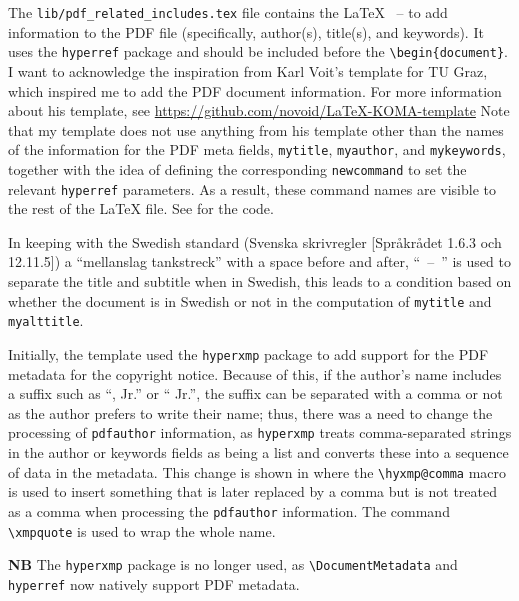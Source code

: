 \documentclass[12pt, twoside]{article}
\newcommand{\fname}[1]{\texttt{#1}}
\begin{document}
The \fname{lib/pdf\_related\_includes.tex} file contains the \LaTeX{} ~-- to add information
to the \gls{PDF} file (specifically, author(s), title(s), and keywords). It uses the
\texttt{hyperref} package and should be included before the \texttt{\textbackslash begin\{document\}}.
I want to acknowledge the inspiration from Karl Voit's template for TU Graz, which inspired me to add the \gls{PDF} document information. For more information about his template, see \url{https://github.com/novoid/LaTeX-KOMA-template}
Note that my template does not use anything from his template other than the names of the information for the \gls{PDF} meta fields, \ie \texttt{mytitle}, \texttt{myauthor}, and \texttt{mykeywords}, together with the idea of defining the corresponding \texttt{newcommand} to set the relevant \texttt{hyperref} parameters. As a result, these command names are visible to the rest of the \LaTeX{} file. See  for the code.

In keeping with the Swedish standard (\foreignlanguage{swedish}{Svenska skrivregler [Språkrådet 1.6.3 och 12.11.5]}) a \enquote{\foreignlanguage{swedish}{mellanslag tankstreck}} with a space before and after, \ie \enquote{\hbox{ – }} is used to separate the title and subtitle when in Swedish, this leads to a condition based on whether the document is in Swedish or not in the computation of \texttt{mytitle} and \texttt{myalttitle}.

Initially, the template used the \texttt{hyperxmp} package to add support for the \gls{PDF} metadata for the copyright notice. Because of this, if the author's name includes a suffix such as \enquote{, Jr.} or \enquote{ Jr.}, \ie the suffix can be separated with a comma or not as the author prefers to write their name; thus, there was a need to change the processing of \texttt{pdfauthor} information, as \texttt{hyperxmp} treats comma-separated strings in the author or keywords fields as being a list and converts these into a sequence of data in the metadata. This change is shown in  where the \texttt{\textbackslash hyxmp@comma} macro is used to insert something that is later replaced by a comma but is not treated as a comma when processing the \texttt{pdfauthor} information. The command \texttt{\textbackslash xmpquote} is used to wrap the whole name.

\noindent \textbf{NB} The \texttt{hyperxmp} package is no longer used, as \texttt{\textbackslash DocumentMetadata} and \texttt{hyperref} now natively support \gls{PDF} metadata.
\clearpage
\end{document}
